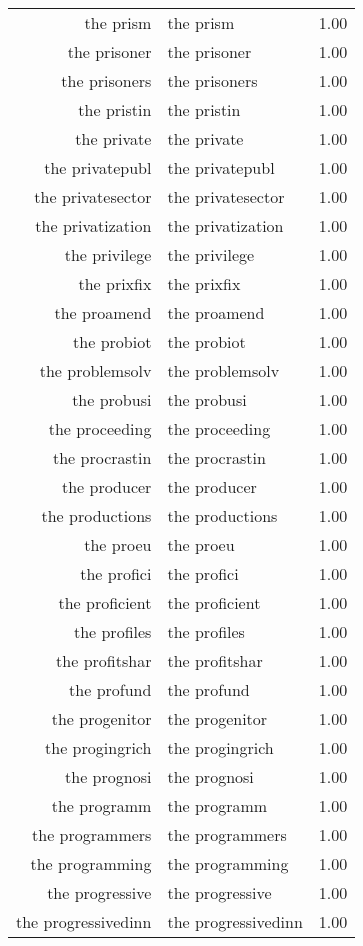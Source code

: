 \begin{table}[ht]
\begin{tabular}{rlr}
  the prism & the prism & 1.00 \\ 
  the prisoner & the prisoner & 1.00 \\ 
  the prisoners & the prisoners & 1.00 \\ 
  the pristin & the pristin & 1.00 \\ 
  the private & the private & 1.00 \\ 
  the privatepubl & the privatepubl & 1.00 \\ 
  the privatesector & the privatesector & 1.00 \\ 
  the privatization & the privatization & 1.00 \\ 
  the privilege & the privilege & 1.00 \\ 
  the prixfix & the prixfix & 1.00 \\ 
  the proamend & the proamend & 1.00 \\ 
  the probiot & the probiot & 1.00 \\ 
  the problemsolv & the problemsolv & 1.00 \\ 
  the probusi & the probusi & 1.00 \\ 
  the proceeding & the proceeding & 1.00 \\ 
  the procrastin & the procrastin & 1.00 \\ 
  the producer & the producer & 1.00 \\ 
  the productions & the productions & 1.00 \\ 
  the proeu & the proeu & 1.00 \\ 
  the profici & the profici & 1.00 \\ 
  the proficient & the proficient & 1.00 \\ 
  the profiles & the profiles & 1.00 \\ 
  the profitshar & the profitshar & 1.00 \\ 
  the profund & the profund & 1.00 \\ 
  the progenitor & the progenitor & 1.00 \\ 
  the progingrich & the progingrich & 1.00 \\ 
  the prognosi & the prognosi & 1.00 \\ 
  the programm & the programm & 1.00 \\ 
  the programmers & the programmers & 1.00 \\ 
  the programming & the programming & 1.00 \\ 
  the progressive & the progressive & 1.00 \\ 
  the progressivedinn & the progressivedinn & 1.00 \\ 

\end{tabular}
\end{table}
